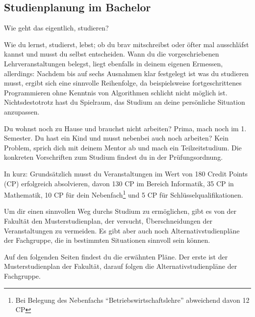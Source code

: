 

\subsection{Studienplanung im Bachelor}

Wie geht das eigentlich, studieren?

Wie du lernst, studierst, lebst; ob du brav mitschreibst oder öfter mal ausschläfst kannst und musst du selbst entscheiden. Wann du die vorgeschriebenen Lehrveranstaltungen belegst, liegt ebenfalls in deinem eigenen Ermessen, allerdings: Nachdem bis auf sechs Ausnahmen klar festgelegt ist was du studieren musst, ergibt sich eine sinnvolle Reihenfolge, da beispielsweise fortgeschrittenes Programmieren ohne Kenntnis von Algorithmen schlicht nicht möglich ist. Nichtsdestotrotz hast du Spielraum, das Studium an deine persönliche Situation anzupassen.


Du wohnst noch zu Hause und brauchst nicht arbeiten? Prima, mach noch \iftoggle{winter}{Theoretische Informatik 1}{Technische Informatik oder Computernetze} im 1. Semester. Du hast ein Kind und musst nebenbei auch noch arbeiten? Kein Problem, sprich dich mit deinem Mentor ab und mach ein Teilzeitstudium. Die konkreten Vorschriften zum Studium findest du in der Prüfungsordnung.


In kurz: Grundsätzlich musst du Veranstaltungen im Wert von 180 Credit Points (CP) erfolgreich absolvieren, davon 130 CP im Bereich Informatik, 35 CP in Mathematik, 10 CP für dein Nebenfach\footnote{Bei Belegung des Nebenfachs \enquote{Betriebswirtschaftslehre} abweichend davon 12 CP} und 5 CP für Schlüsselqualifikationen. 

Um dir einen sinnvollen Weg durchs Studium zu ermöglichen, gibt es von der Fakultät den Musterstudienplan, der versucht, Überschneidungen der Veranstaltungen zu vermeiden. Es gibt aber auch noch Alternativstudienpläne der Fachgruppe, die in bestimmten Situationen sinnvoll sein können. 

Auf den folgenden Seiten findest du die erwähnten Pläne. Der erste ist der Musterstudienplan der Fakultät, darauf folgen die Alternativstudienpläne der Fachgruppe.


